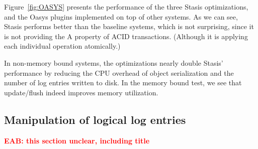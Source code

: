 \documentclass[letterpaper,twocolumn,10pt]{article}
\newcommand{\yad}{Stasis\xspace}
\newcommand{\yads}{Stasis'\xspace}
\newcommand{\oasys}{Oasys\xspace}
\newcommand{\eab}[1]{\textcolor{red}{\bf EAB: #1}}
\begin{document}
Figure~\ref{fig:OASYS} presents the performance of the three
\yad optimizations, and the \oasys plugins implemented on top of other
systems.  As we can see, \yad performs better than the baseline
systems, which is not surprising, since it is not providing the A
property of ACID transactions.  (Although it is applying each individual operation atomically.)

In non-memory bound systems, the optimizations nearly double \yads
performance by reducing the CPU overhead of object serialization and
the number of log entries written to disk.  In the memory bound test,
we see that update/flush indeed improves memory utilization.


\subsection{Manipulation of logical log entries}

\eab{this section unclear, including title}
\end{document}
